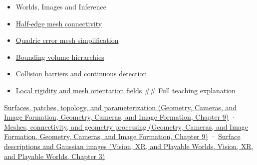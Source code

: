 \begin{itemize}
\item
  {Worlds, Images and Inference}
\item
  \hyperref[appendix-1aea26b2307f]{Half-edge mesh connectivity}
\item
  \hyperref[appendix-1dd4ad54ca57]{Quadric error mesh simplification}
\item
  \hyperref[appendix-0b426c47dd78]{Bounding volume hierarchies}
\item
  \hyperref[appendix-a9ba01fa72a6]{Collision barriers and continuous detection}
\item
  \hyperref[appendix-7107009c505b]{Local rigidity and mesh orientation fields} \#\# Full teaching explanation
\end{itemize}

\href{../03-Geometry-Cameras-and-Image-Formation/main.pdf\#nameddest=03-visual-computing-i-ch002-surfaces-patches-topology-and-parameterization}{Surfaces, patches, topology, and parameterization (Geometry, Cameras, and Image Formation, Geometry, Cameras, and Image Formation, Chapter 9)} · \href{../03-Geometry-Cameras-and-Image-Formation/main.pdf\#nameddest=03-visual-computing-i-ch002-meshes-connectivity-and-geometry-processing}{Meshes, connectivity, and geometry processing (Geometry, Cameras, and Image Formation, Geometry, Cameras, and Image Formation, Chapter 9)} · \href{../07-Vision-XR-and-Playable-Worlds/main.pdf\#nameddest=04-visual-computing-ii-ch032-surface-descriptions-and-gaussian-images}{Surface descriptions and Gaussian images (Vision, XR, and Playable Worlds, Vision, XR, and Playable Worlds, Chapter 3)}
